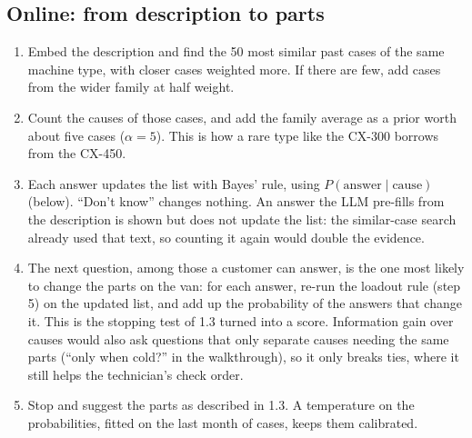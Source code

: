 \documentclass[11pt,a4paper]{article}
\begin{document}
\subsection{Online: from description to parts}\label{sec:online}

\begin{enumerate}
  \item Embed the description and find the 50 most similar past cases of the same machine type, with closer cases weighted more. If there are few, add cases from the wider family at half weight.
  \item Count the causes of those cases, and add the family average as a prior worth about five cases ($\alpha = 5$). This is how a rare type like the CX-300 borrows from the CX-450.
  \item Each answer updates the list with Bayes' rule, using $P(\text{answer} \mid \text{cause})$ (below). “Don't know” changes nothing. An answer the LLM pre-fills from the description is shown but does not update the list: the similar-case search already used that text, so counting it again would double the evidence.
  \item The next question, among those a customer can answer, is the one most likely to change the parts on the van: for each answer, re-run the loadout rule (step 5) on the updated list, and add up the probability of the answers that change it. This is the stopping test of 1.3 turned into a score. Information gain over causes would also ask questions that only separate causes needing the same parts (“only when cold?” in the walkthrough), so it only breaks ties, where it still helps the technician's check order.
  \item Stop and suggest the parts as described in 1.3. A temperature on the probabilities, fitted on the last month of cases, keeps them calibrated.
\end{enumerate}
\end{document}
